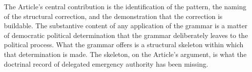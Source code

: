 The Article's central contribution is the identification of the pattern,
the naming of the structural correction,
and the demonstration that the correction is buildable.
The substantive content of any application of the grammar is a matter of democratic political determination
that the grammar deliberately leaves to the political process.
What the grammar offers is a structural skeleton within which that determination is made.
The skeleton, on the Article's argument, is what the doctrinal record of delegated emergency authority has been missing.
